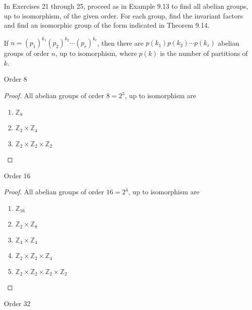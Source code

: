 In Exercises 21 through 25, proceed as in Example 9.13 to find all abelian groups, up to isomorphism, of the given order. For each group, find the invariant factors and find an isomorphic group of the form indicated in Theorem 9.14.

If $n = {(p_{1})}^{k_{1}}{(p_{2})}^{k_{2}}\cdots {(p_{r})}^{k_{r}}$, then there are $p(k_{1})p(k_{2})\cdots p(k_{r})$ abelian groups of order $n$, up to isomorphism, where $p(k)$ is the number of partitions of $k$.

\begin{exercise}
    Order 8
\end{exercise}

\begin{proof}
    All abelian groups of order $8 = 2^{3}$, up to isomorphism are
    \begin{enumerate}
        \item $\mathbb{Z}_{8}$
        \item $\mathbb{Z}_{2} \times \mathbb{Z}_{4}$
        \item $\mathbb{Z}_{2} \times \mathbb{Z}_{2} \times \mathbb{Z}_{2}$
    \end{enumerate}
\end{proof}

\begin{exercise}
    Order 16
\end{exercise}

\begin{proof}
    All abelian groups of order $16 = 2^{4}$, up to isomorphism are
    \begin{enumerate}
        \item $\mathbb{Z}_{16}$
        \item $\mathbb{Z}_{2} \times \mathbb{Z}_{8}$
        \item $\mathbb{Z}_{4} \times \mathbb{Z}_{4}$
        \item $\mathbb{Z}_{2} \times \mathbb{Z}_{2} \times \mathbb{Z}_{4}$
        \item $\mathbb{Z}_{2} \times \mathbb{Z}_{2} \times \mathbb{Z}_{2} \times \mathbb{Z}_{2}$
    \end{enumerate}
\end{proof}

\begin{exercise}
    Order 32
\end{exercise}

